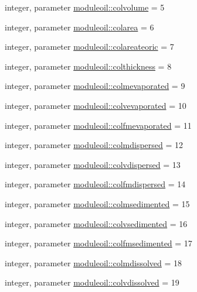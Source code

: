 \begin{DoxyCompactItemize}
\item 
integer, parameter \mbox{\hyperlink{namespacemoduleoil_a0329e06a783575a6ee4822170244d824}{moduleoil\+::colvolume}} = 5
\item 
integer, parameter \mbox{\hyperlink{namespacemoduleoil_ab1a2f215806040cbb2c3a4a06fc653cd}{moduleoil\+::colarea}} = 6
\item 
integer, parameter \mbox{\hyperlink{namespacemoduleoil_af89963f975b5fe3b77b9127ab82f09bd}{moduleoil\+::colareateoric}} = 7
\item 
integer, parameter \mbox{\hyperlink{namespacemoduleoil_a8b3c2c19e4304e2265d2bf593bad3caf}{moduleoil\+::colthickness}} = 8
\item 
integer, parameter \mbox{\hyperlink{namespacemoduleoil_adaaeb4924cb8175bf48760820f0f86ab}{moduleoil\+::colmevaporated}} = 9
\item 
integer, parameter \mbox{\hyperlink{namespacemoduleoil_aa3ee857b2609932bc79ecde6ce062a04}{moduleoil\+::colvevaporated}} = 10
\item 
integer, parameter \mbox{\hyperlink{namespacemoduleoil_ae96f8585b6e356dddde5770967401e27}{moduleoil\+::colfmevaporated}} = 11
\item 
integer, parameter \mbox{\hyperlink{namespacemoduleoil_a351b4b4c542f44239dc1769aabc19e82}{moduleoil\+::colmdispersed}} = 12
\item 
integer, parameter \mbox{\hyperlink{namespacemoduleoil_afc39ec2f9ea25dbc832655e39fdad7b3}{moduleoil\+::colvdispersed}} = 13
\item 
integer, parameter \mbox{\hyperlink{namespacemoduleoil_aa43dd6c5feda3ffd11eaf45da4be53b4}{moduleoil\+::colfmdispersed}} = 14
\item 
integer, parameter \mbox{\hyperlink{namespacemoduleoil_ab28c522cdb0ba8e9677c8bc1b4fcf6a0}{moduleoil\+::colmsedimented}} = 15
\item 
integer, parameter \mbox{\hyperlink{namespacemoduleoil_ad0b64aaf8de58d27bdb5ab1c3dc70e2a}{moduleoil\+::colvsedimented}} = 16
\item 
integer, parameter \mbox{\hyperlink{namespacemoduleoil_ab425dda8c296468b2905a264162f96e9}{moduleoil\+::colfmsedimented}} = 17
\item 
integer, parameter \mbox{\hyperlink{namespacemoduleoil_a59d6f41aca9855d6a7327efac8f3f4a8}{moduleoil\+::colmdissolved}} = 18
\item 
integer, parameter \mbox{\hyperlink{namespacemoduleoil_a9ffaf173e8c95b21bad287b5861ef859}{moduleoil\+::colvdissolved}} = 19
\item 

\end{DoxyCompactItemize}
